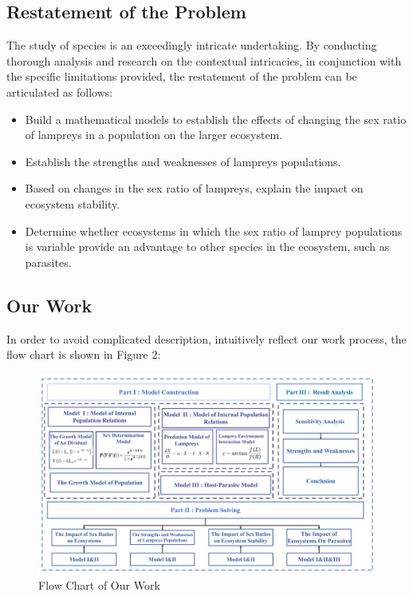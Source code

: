 \documentclass[12pt]{article}  %
\begin{document}
\subsection{Restatement of the Problem}
The study of species is an exceedingly intricate undertaking. By conducting thorough analysis and research on the contextual intricacies, in conjunction with the specific limitations provided, the restatement of the problem can be articulated as follows:
\begin{itemize}
\setlength{\parsep}{0ex} %
\setlength{\topsep}{2ex} %
\setlength{\itemsep}{1ex} %
\item Build a mathematical models to establish the effects of changing the sex ratio of lampreys in a population on the larger ecosystem.
\item Establish the strengths and weaknesses of lampreys populations.
\item Based on changes in the sex ratio of lampreys, explain the impact on ecosystem stability.
\item Determine whether ecosystems in which the sex ratio of lamprey populations is variable provide an advantage to other species in the ecosystem, such as parasites.
\end{itemize}
\subsection{Our Work}
In order to avoid complicated description, intuitively reflect our work process, the flow chart is shown in Figure 2:

\begin{figure}[htbp]  %
\centering  %
\includegraphics[width=1.\textwidth]{Flow_Chart.jpg} %
\caption{Flow Chart of Our Work} %
\end{figure}
\vspace{-0.8cm}
\end{document}
